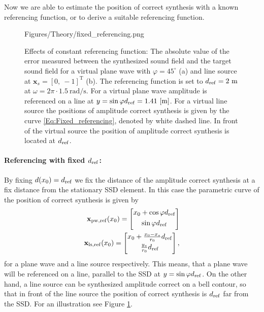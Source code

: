 Now we are able to estimate the position of correct synthesis with a known referencing function, or to derive a suitable referencing function.

\begin{figure}
	\centering
	\begin{overpic}[width = 1\columnwidth ]{Figures/Theory/fixed_referencing.png}
	\scriptsize
	\end{overpic}
\caption{ Effects of constant referencing function: The absolute value of the error measured between the synthesized sound field and the target sound field for a virtual plane wave with $\varphi = 45^{\circ}$ (a) and line source at $\mathbf{x}_s = [0,\ -1]^{\mathrm{T}}$ (b). The referencing function is set to $d_{\mathrm{ref}} = 2~\mathrm{m}$ at $\omega = 2\pi\cdot 1.5~\mathrm{rad/s}$. For a virtual plane wave amplitude is referenced on a line at $y = \sin\varphi d_{\mathrm{ref}} = 1.41~[\mathrm{m}]$. For a virtual line source the positions of amplitude correct synthesis is given by the curve \eqref{Eq:Fixed_referencing}, denoted by white dashed line. In front of the virtual source the position of amplitude correct synthesis is located at $d_{\mathrm{ref}}$. }
	\label{Fig:Theory:fixed_referencing}
\end{figure}
\paragraph{Referencing with fixed $d_{\mathrm{ref}}$:\\}
By fixing $d(x_0) = d_{\mathrm{ref}}$ we fix the distance of the amplitude correct synthesis at a fix distance from the stationary SSD element. In this case the parametric curve of the position of correct synthesis is given by
\begin{eqnarray}
\mathbf{x}_{\mathrm{pw, ref}}(x_0) =  \begin{bmatrix} x_0 + \cos\varphi d_{\mathrm{ref}} \\[0.3em] \sin\varphi d_{\mathrm{ref}} \\[0.3em]    \end{bmatrix} \\
\mathbf{x}_{\mathrm{ls, ref}}(x_0) =  \begin{bmatrix} x_0 + \frac{x_0-x_s}{r_0} d_{\mathrm{ref}} \\[0.3em] \frac{y_s}{r_0} d_{\mathrm{ref}} \\[0.3em]    \end{bmatrix},
\label{Eq:Fixed_referencing}
\end{eqnarray}
for a plane wave and a line source respectively. This means, that a plane wave will be referenced on a line, parallel to the SSD at $y = \sin\varphi d_{\mathrm{ref}}$. On the other hand, a line source can be synthesized amplitude correct on a bell contour, so that in front of the line source the position of correct synthesis is $d_{\mathrm{ref}}$ far from the SSD. For an illustration see Figure \ref{Fig:Theory:fixed_referencing}.

